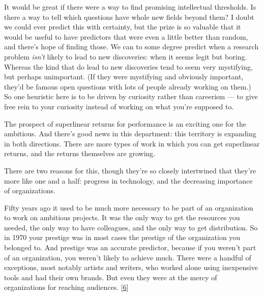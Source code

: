 It would be great if there were a way to find
                  promising intellectual thresholds. Is there a way to tell
                  which questions have whole new fields beyond them? I doubt we
                  could ever predict this with certainty, but the prize is so
                  valuable that it would be useful to have predictors that were
                  even a little better than random, and there's hope of finding
                  those. We can to some degree predict when a research problem
                  \emph{isn't} likely to lead to new discoveries: when it seems
                  legit but boring. Whereas the kind that do lead to new
                  discoveries tend to seem very mystifying, but perhaps
                  unimportant. (If they were mystifying and obviously important,
                  they'd be famous open questions with lots of people already
                  working on them.) So one heuristic here is to be driven by
                  curiosity rather than careerism --- to give free rein to
                  your curiosity instead of working on what you're supposed
                  to.






                  The prospect of superlinear returns for performance is an
                  exciting one for the ambitious. And there's good news in this
                  department: this territory is expanding in both directions.
                  There are more types of work in which you can get superlinear
                  returns, and the returns themselves are growing.

There
                  are two reasons for this, though they're so closely
                  intertwined that they're more like one and a half: progress in
                  technology, and the decreasing importance of organizations.

Fifty
                  years ago it used to be much more necessary to be part of an
                  organization to work on ambitious projects. It was the only
                  way to get the resources you needed, the only way to have
                  colleagues, and the only way to get distribution. So in 1970
                  your prestige was in most cases the prestige of the
                  organization you belonged to. And prestige was an accurate
                  predictor, because if you weren't part of an organization, you
                  weren't likely to achieve much. There were a handful of
                  exceptions, most notably artists and writers, who worked alone
                  using inexpensive tools and had their own brands. But even
                  they were at the mercy of organizations for reaching
                  audiences.
                  [\href{\#f6n}{6}]

